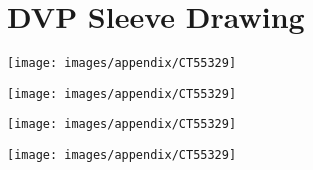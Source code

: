 \section{DVP Sleeve Drawing}
\label{app:SleeveDrawing}
\begin{singlespace}
\begin{center}
\texttt{[image: images/appendix/CT55329]}
\end{center}
\end{singlespace}
\pagebreak
\begin{singlespace}
\begin{center}
\texttt{[image: images/appendix/CT55329]}
\end{center}
\end{singlespace}
\pagebreak
\begin{singlespace}
\begin{center}
\texttt{[image: images/appendix/CT55329]}
\end{center}
\end{singlespace}
\pagebreak
\begin{singlespace}
\begin{center}
\texttt{[image: images/appendix/CT55329]}
\end{center}
\end{singlespace}



% 

% 

% 

